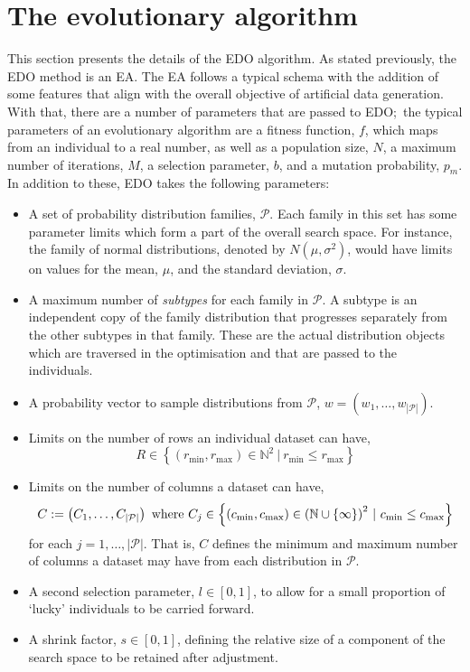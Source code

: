 \section{The evolutionary algorithm}\label{sec:algorithm}

This section presents the details of the EDO algorithm. As stated previously,
the EDO method is an EA. The EA follows a typical schema with the addition of
some features that align with the overall objective of artificial data
generation. With that, there are a number of parameters that are passed to EDO;\
the typical parameters of an evolutionary algorithm are a fitness function,
\(f\), which maps from an individual to a real number, as well as a population
size, \(N\), a maximum number of iterations, \(M\), a selection parameter,
\(b\), and a mutation probability, \(p_m\). In addition to these, EDO takes the
following parameters:
\begin{itemize}
    \item A set of probability distribution families, \(\mathcal{P}\). Each
        family in this set has some parameter limits which form a part of the
        overall search space. For instance, the family of normal distributions,
        denoted by \(N(\mu, \sigma^2)\), would have limits on values for the
        mean, \(\mu\), and the standard deviation, \(\sigma\).
    \item A maximum number of \emph{subtypes} for each family in
        \(\mathcal{P}\). A subtype is an independent copy of the family
        distribution that progresses separately from the other subtypes in that
        family. These are the actual distribution objects which are traversed in
        the optimisation and that are passed to the individuals.
    \item A probability vector to sample distributions from \(\mathcal{P}\),
        \(w = \left(w_1, \ldots, w_{|\mathcal{P}|}\right)\).
    \item Limits on the number of rows an individual dataset can have,
        \[
            R \in \left\{%
                (r_{\min}, r_{\max}) \in \mathbb{N}^2~|~r_{\min} \leq r_{\max}
            \right\}
        \]
    \item Limits on the number of columns a dataset can have,
        \[
            C := \left(C_1, \ldots, C_{|\mathcal{P}|}\right)
            \text{ where }
            C_j \in \left\{ (c_{\min}, c_{\max}) \in {%
                \left(\mathbb{N}\cup\{\infty\}\right)
            }^2~|~c_{\min} \leq c_{\max}\right\}
        \]
        for each \(j = 1, \ldots, |\mathcal{P}|\). That is, \(C\) defines the
        minimum and maximum number of columns a dataset may have from each
        distribution in \(\mathcal{P}\).
    \item A second selection parameter, \(l \in [0, 1]\), to allow for a
        small proportion of `lucky' individuals to be carried forward.
    \item A shrink factor, \(s \in [0, 1]\), defining the relative size of a
        component of the search space to be retained after adjustment.
\end{itemize}

